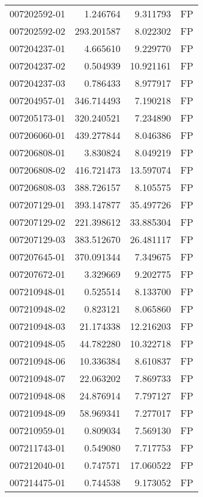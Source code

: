 \begin{tabular}{lrrl}
007202592-01 &    1.246764 &       9.311793 &   FP \\
007202592-02 &  293.201587 &       8.022302 &   FP \\
007204237-01 &    4.665610 &       9.229770 &   FP \\
007204237-02 &    0.504939 &      10.921161 &   FP \\
007204237-03 &    0.786433 &       8.977917 &   FP \\
007204957-01 &  346.714493 &       7.190218 &   FP \\
007205173-01 &  320.240521 &       7.234890 &   FP \\
007206060-01 &  439.277844 &       8.046386 &   FP \\
007206808-01 &    3.830824 &       8.049219 &   FP \\
007206808-02 &  416.721473 &      13.597074 &   FP \\
007206808-03 &  388.726157 &       8.105575 &   FP \\
007207129-01 &  393.147877 &      35.497726 &   FP \\
007207129-02 &  221.398612 &      33.885304 &   FP \\
007207129-03 &  383.512670 &      26.481117 &   FP \\
007207645-01 &  370.091344 &       7.349675 &   FP \\
007207672-01 &    3.329669 &       9.202775 &   FP \\
007210948-01 &    0.525514 &       8.133700 &   FP \\
007210948-02 &    0.823121 &       8.065860 &   FP \\
007210948-03 &   21.174338 &      12.216203 &   FP \\
007210948-05 &   44.782280 &      10.322718 &   FP \\
007210948-06 &   10.336384 &       8.610837 &   FP \\
007210948-07 &   22.063202 &       7.869733 &   FP \\
007210948-08 &   24.876914 &       7.797127 &   FP \\
007210948-09 &   58.969341 &       7.277017 &   FP \\
007210959-01 &    0.809034 &       7.569130 &   FP \\
007211743-01 &    0.549080 &       7.717753 &   FP \\
007212040-01 &    0.747571 &      17.060522 &   FP \\
007214475-01 &    0.744538 &       9.173052 &   FP \\

\end{tabular}
